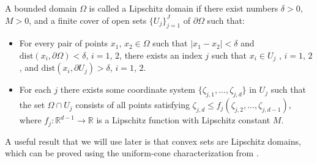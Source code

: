 \begin{definition}
A bounded domain $\Omega$ is called a Lipschitz domain if there exist numbers $\delta > 0$, $M > 0$,  and a finite cover of open sets $\{U_j\}_{j=1}^J$ of $\partial\Omega$ such that:
\begin{itemize}
\item For every pair of points $x_1$, $x_2 \in\Omega$ such that $|x_1
  - x_2| < \delta$ and $\text{dist}(x_i, \partial\Omega) < \delta$, $i
  = 1$, $2$, there exists an index $j$ such that $x_i \in U_j$ , $i =
  1$, $2$, and $\text{dist}(x_i, \partial U_j) > \delta$, $i = 1$, $2$.
\item For each
  $j$ there exists some coordinate system
  $\{\zeta_{j,1},...,\zeta_{j,d}\}$ in $U_j$ such that the set $\Omega
  \cap U_j$ consists of all points satisfying $\zeta_{j,d} \leq
  f_j(\zeta_{j,2},...,\zeta_{j,d-1})$, where
  $f_j:\mathbb{R}^{d-1}\rightarrow\mathbb{R}$ is a Lipschitz function
  with Lipschitz constant $M$.
\end{itemize}
\end{definition}

A useful result that we will use later is that convex sets are
Lipschitz domains, which can be proved using the uniform-cone characterization from \cite{ConvexLipDomain}. 


